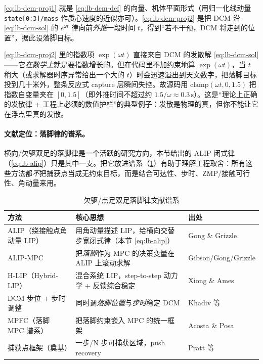 \cref{eq:lb-dcm-proj1} 就是 \cref{eq:lb-dcm-def} 的向量、机体平面形式（用归一化线动量 \texttt{state[0:3]/mass} 作质心速度的近似亦可）。\cref{eq:lb-dcm-proj2} 是把 DCM 沿 \cref{eq:lb-dcm-sol} 的 $e^{\omega t}$ 律向前\emph{外推}一段时间 $t$，得到“若不干预，DCM 将走到的位置”，据此设落脚目标。

\begin{pitfall}\label{pit:lb-clamp-exp}
\cref{eq:lb-dcm-proj2} 里的指数项 $\exp(\omega t)$ 直接来自 DCM 的发散解 \cref{eq:lb-dcm-sol}——它\emph{在数学上}就是要指数增长的。但在代码里不加约束地算 $\exp(\omega t)$，当 $t$ 稍大（或求解器时序异常给出一个大的 $t$）时会迅速溢出到天文数字，把落脚目标投到几十米外，整条反应式 capture 层瞬间失控。故源码用 $\mathrm{clamp}(\omega t,0,1.5)$ 把指数自变量夹在 $[0,1.5]$（即外推时间不超过约 $1.5/\omega\approx 0.3\,\mathrm{s}$）。这是“理论上正确的发散律 + 工程上必须的数值护栏”的典型例子：发散是物理的真，但你不能让它在浮点里真的发散。
\end{pitfall}

\paragraph{文献定位：落脚律的谱系。}
横向/欠驱双足的落脚律是一个活跃的研究方向，本节给出的 ALIP 闭式律（\cref{eq:lb-alip}）只是其中一支。把它放进谱系（\cref{tab:lb-footstep-lit}）有助于理解工程取舍：所有这些方法都\emph{不}把捕获点当成无约束目标，而是结合可达性、步时、ZMP/接触可行性、角动量来用。

\begin{table}[H]\centering\small
\caption{欠驱/点足双足落脚律文献谱系}
\begin{tabular}{p{} p{} p{}}
\toprule
方法 & 核心思想 & 出处 \\
\midrule
ALIP（绕接触点角动量 LIP） & 用角动量描述 LIP，给横向交替步宽闭式律（本节 \cref{eq:lb-alip}） & Gong \& Grizzle\cite{gong2022alip} \\
ALIP-MPC & 把\emph{落脚}作为 MPC 的决策变量在 ALIP 上滚动求解 & Gibson/Gong/Grizzle\cite{gibson2022alipmpc} \\
H-LIP（Hybrid-LIP） & 混合系统 LIP，step-to-step 动力学 + 反馈综合稳定 & Xiong \& Ames\cite{xiong2022hlip} \\
DCM 步位 + 步时调整 & 同时调\emph{落脚位置}与\emph{步时}稳定 DCM & Khadiv 等\cite{khadiv2016stepping} \\
MPFC（落脚 MPC 谱系） & 把落脚约束嵌入 MPC 的统一框架 & Acosta \& Posa\cite{acosta2023mpfc} \\
捕获点框架（奠基） & 一步/N 步可捕获区域，push recovery & Pratt 等\cite{pratt2006capture} \\
\bottomrule
\end{tabular}
\label{tab:lb-footstep-lit}
\end{table}

